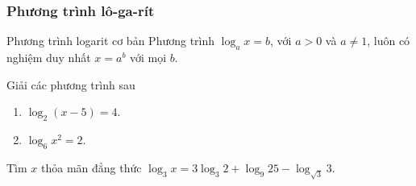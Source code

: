 















\subsubsection{Phương trình lô-ga-rít}
\begin{dang}{Phương trình logarit cơ bản}
	Phương trình $\log_a x=b$, với $a>0$ và $a\neq 1$, luôn có nghiệm duy nhất $x=a^b$ với mọi $b$.
\end{dang}
\begin{vd}%
	Giải các phương trình sau
	\begin{enumerate}
		\item $\log_2(x-5)=4$.
		\item $\log_6 x^2=2$.
		
	\end{enumerate}
	 
\end{vd}

\begin{vd}%
	Tìm $x$ thỏa mãn đẳng thức $\log_3 x =3\log_3 2+\log_9 25 -\log_{\sqrt{3}}3$.
\end{vd}

